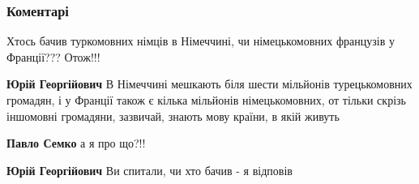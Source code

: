 
 
 
 
 
\subsubsection{Коментарі}
\label{sec:21_07_2021.fb.andrievskij_mihail.1.rus_ukraincy.cmt}

\begin{itemize}
 
Хтось бачив туркомовних німців в Німеччині, чи німецькомовних французів у Франції??? Отож!!!

\begin{itemize}
 
\textbf{Юрій Георгійович} В Німеччині мешкають біля шести мільйонів
турецькомовних громадян, і у Франції також є кілька мільйонів німецькомовних,
от тільки скрізь іншомовні громадяни, зазвичай, знають мову країни, в якій
живуть

\begin{itemize}
 
\textbf{Павло Семко} а я про що?!!

 
\textbf{Юрій Георгійович} Ви спитали, чи хто бачив - я відповів

 

\end{itemize}
\end{itemize}
\end{itemize}
